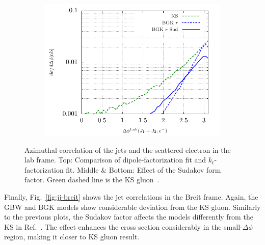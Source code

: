\documentclass[a4,12pt]{article}
\begin{document}
\begin{figure}[p]
\begin{subfigure}{0.5\textwidth}
		\includegraphics[width=\textwidth]{gnuplot/plotBGK3Lab}
	\end{subfigure}
\caption{\footnotesize Azimuthal correlation of the jets and the scattered electron in the lab frame. Top: Comparison of dipole-factorization fit and $k_t$-factorization fit. Middle \& Bottom: Effect of the Sudakov form factor.  Green dashed line is the KS gluon~\cite{vanHameren:2021sqc}.}
\label{fig:je-lab}
\end{figure}

Finally, Fig.~\ref{fig:jj-breit} shows the jet correlations in the Breit frame. Again, the GBW and BGK models show considerable deviation from the KS gluon. Similarly to the previous plots, the Sudakov factor affects the models differently from the KS in Ref.~\cite{vanHameren:2021sqc}.
The effect enhances the cross section considerably in the small-$\Delta\phi$ region, making it closer to KS gluon result.
\end{document}
